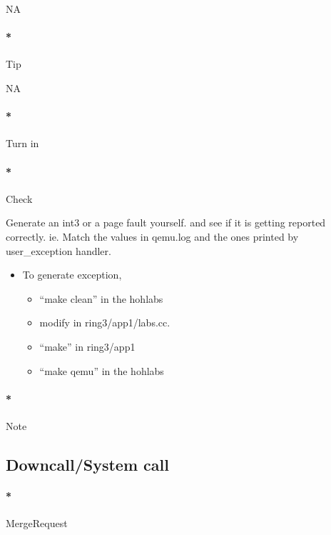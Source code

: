 \documentclass[]{article}
\providecommand{\tightlist}{%
  \setlength{\itemsep}{0pt}\setlength{\parskip}{0pt}}
\let\oldparagraph\paragraph
\renewcommand{\paragraph}[1]{\oldparagraph{#1}\mbox{}}
\begin{document}
NA

\paragraph*{Tip}\label{tip-11}

NA

\paragraph*{Turn in}\label{turn-in-11}

\paragraph*{Check}\label{check-11}

Generate an int3 or a page fault yourself. and see if it is getting
reported correctly. ie. Match the values in qemu.log and the ones
printed by user\_exception handler.

\begin{itemize}
\tightlist
\item
  To generate exception,

  \begin{itemize}
  \tightlist
  \item
    ``make clean'' in the hohlabs
  \item
    modify in ring3/app1/labs.cc.
  \item
    ``make'' in ring3/app1
  \item
    ``make qemu'' in the hohlabs
  \end{itemize}
\end{itemize}

\paragraph*{Note}\label{note-13}

\subsection{Downcall/System call}\label{downcallsystem-call}

\paragraph*{MergeRequest}\label{mergerequest-12}
\end{document}
